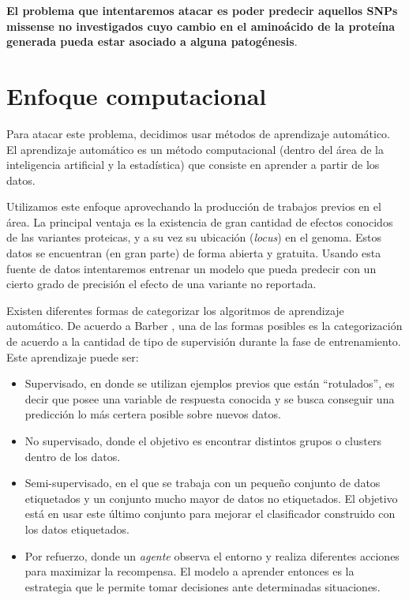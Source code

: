 \textbf{El problema que intentaremos atacar es poder predecir aquellos SNPs missense no investigados cuyo cambio en el aminoácido de la proteína generada pueda estar asociado a alguna patogénesis}. 

\section{Enfoque computacional}

Para atacar este problema, decidimos usar métodos de aprendizaje automático. El aprendizaje automático es un método computacional (dentro del área de la inteligencia artificial y la estadística) que consiste en aprender a partir de los datos. 

Utilizamos este enfoque aprovechando la producción de trabajos previos en el área. La principal ventaja es la existencia de gran cantidad de efectos conocidos de las variantes proteicas, y a su vez su ubicación (\textit{locus}) en el genoma. Estos datos se encuentran (en gran parte) de forma abierta y gratuita. Usando esta fuente de datos intentaremos entrenar un modelo que pueda predecir con un cierto grado de precisión el efecto de una variante no reportada. 

Existen diferentes formas de categorizar los algoritmos de aprendizaje automático. De acuerdo a Barber \cite{Barber2011}, una de las formas posibles es la categorización de acuerdo a la cantidad de tipo de supervisión durante la fase de entrenamiento. Este aprendizaje puede ser:

\begin{itemize}
\item Supervisado, en donde se utilizan ejemplos previos que están ``rotulados'', es decir que posee una variable de respuesta conocida y se busca conseguir una predicción lo más certera posible sobre nuevos datos. 
\item No supervisado, donde el objetivo es encontrar distintos grupos o clusters dentro de los datos.
\item Semi-supervisado, en el que se trabaja con un pequeño conjunto de datos etiquetados y un conjunto mucho mayor de datos no etiquetados. El objetivo está en usar este último conjunto para mejorar el clasificador construido con los datos etiquetados.
\item Por refuerzo, donde un \textit{agente} observa el entorno y realiza diferentes acciones para maximizar la recompensa. El modelo a aprender entonces es la estrategia que le permite tomar decisiones ante determinadas situaciones. 
\end{itemize}

